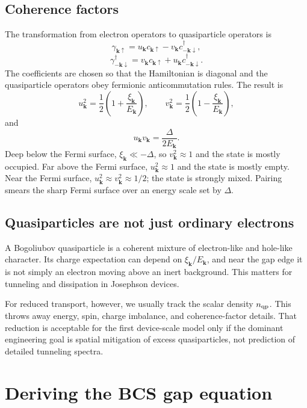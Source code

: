 \documentclass[11pt]{article}
\newcommand{\bk}{{\bm{k}}}
\begin{document}
\subsection{Coherence factors}
The transformation from electron operators to quasiparticle operators is
\begin{equation}
\gamma_{\bk\uparrow}=u_\bk c_{\bk\uparrow}-v_\bk c_{-\bk\downarrow}^{\dagger},
\end{equation}
\begin{equation}
\gamma_{-\bk\downarrow}^{\dagger}=v_\bk c_{\bk\uparrow}+u_\bk c_{-\bk\downarrow}^{\dagger}.
\end{equation}
The coefficients are chosen so that the Hamiltonian is diagonal and the quasiparticle operators obey fermionic anticommutation rules. The result is
\begin{equation}
 u_\bk^2=\frac{1}{2}\left(1+\frac{\xi_\bk}{E_\bk}\right),
 \qquad
 v_\bk^2=\frac{1}{2}\left(1-\frac{\xi_\bk}{E_\bk}\right),
\end{equation}
and
\begin{equation}
 u_\bk v_\bk=\frac{\Delta}{2E_\bk}.
\end{equation}
Deep below the Fermi surface, $\xi_\bk\ll-\Delta$, so $v_\bk^2\approx1$ and the state is mostly occupied. Far above the Fermi surface, $u_\bk^2\approx1$ and the state is mostly empty. Near the Fermi surface, $u_\bk^2\approx v_\bk^2\approx1/2$; the state is strongly mixed. Pairing smears the sharp Fermi surface over an energy scale set by $\Delta$.

\subsection{Quasiparticles are not just ordinary electrons}
A Bogoliubov quasiparticle is a coherent mixture of electron-like and hole-like character. Its charge expectation can depend on $\xi_\bk/E_\bk$, and near the gap edge it is not simply an electron moving above an inert background. This matters for tunneling and dissipation in Josephson devices.

For reduced transport, however, we usually track the scalar density $n_{\mathrm{qp}}$. This throws away energy, spin, charge imbalance, and coherence-factor details. That reduction is acceptable for the first device-scale model only if the dominant engineering goal is spatial mitigation of excess quasiparticles, not prediction of detailed tunneling spectra.

\section{Deriving the BCS gap equation}
\end{document}
